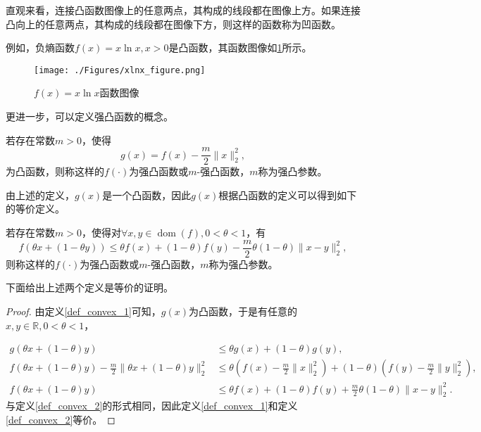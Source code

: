 直观来看，连接凸函数图像上的任意两点，其构成的线段都在图像上方。如果连接凸向上的任意两点，其构成的线段都在图像下方，则这样的函数称为凹函数。

例如，负熵函数$f(x)=x\ln x, x>0$是凸函数，其函数图像如\ref{figure_xlnx}所示。

\begin{figure}[hbtp]
    \centering
    \texttt{[image: ./Figures/xlnx\_figure.png]}
    \caption{$f(x)=x\ln x$函数图像}
    \label{figure_xlnx}
\end{figure}

更进一步，可以定义强凸函数的概念。

\begin{definition}\label{def_convex_1}
    若存在常数$m>0$，使得
    \begin{equation}
        g(x) = f(x) - \frac{m}{2}\|x\|_{2}^{2} ,
    \end{equation}
    为凸函数，则称这样的$f(\cdot)$为强凸函数或$m$-强凸函数，$m$称为强凸参数。
\end{definition}

由上述的定义，$g(x)$是一个凸函数，因此$g(x)$根据凸函数的定义可以得到如下的等价定义。

\begin{definition}\label{def_convex_2}
    若存在常数$m>0$，使得对$\forall x, y \in \mathop{\mathrm{dom}} (f), 0<\theta<1$，有
    \begin{equation}
        f(\theta x+(1-\theta y)) \leq \theta f(x) + (1-\theta)f(y) - \frac{m}{2}\theta(1-\theta)\|x-y\|_{2}^{2} ,
    \end{equation}
    则称这样的$f(\cdot)$为强凸函数或$m$-强凸函数，$m$称为强凸参数。
\end{definition}

下面给出上述两个定义是等价的证明。
\begin{proof}
    由定义\ref{def_convex_1}可知，$g(x)$为凸函数，于是有任意的$x, y\in \mathbb{R}, 0<\theta<1$，

    \begin{equation*}
        \begin{split}
            g(\theta x + (1-\theta)y) &\leq \theta g(x) + (1-\theta) g(y) ,\\
            f(\theta x + (1-\theta)y) - \frac{m}{2}\|\theta x+(1-\theta)y\|_{2}^{2} &\leq \theta(f(x)-\frac{m}{2}\|x\|_{2}^{2}) + (1-\theta) (f(y)-\frac{m}{2}\|y\|_{2}^{2}) ,\\
            f(\theta x + (1-\theta)y) &\leq \theta f(x) + (1-\theta) f(y) + \frac{m}{2}\theta(1-\theta)\|x-y\|_{2}^{2} .
        \end{split}
    \end{equation*}
与定义\ref{def_convex_2}的形式相同，因此定义\ref{def_convex_1}和定义\ref{def_convex_2}等价。
\end{proof}

